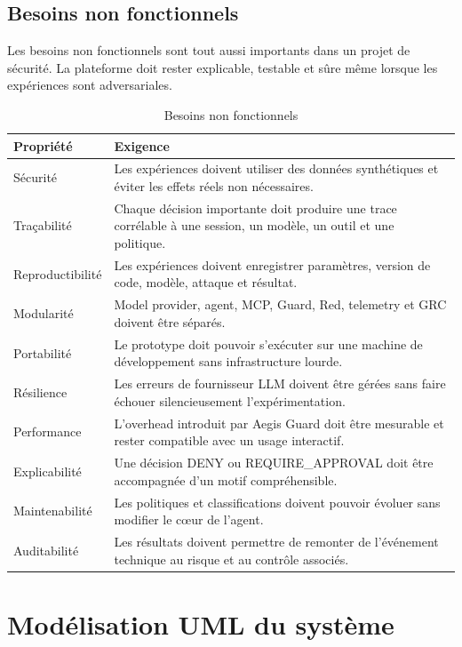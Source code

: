 \subsection{Besoins non fonctionnels}

Les besoins non fonctionnels sont tout aussi importants dans un projet de sécurité. La plateforme doit rester explicable, testable et sûre même lorsque les expériences sont adversariales.

\begin{table}[H]
\centering
\caption{Besoins non fonctionnels}
\label{tab:besoins-non-fonctionnels}
\begin{tabularx}{\textwidth}{p{2.2cm} X}
\toprule
\textbf{Propriété} & \textbf{Exigence} \\
\midrule
Sécurité & Les expériences doivent utiliser des données synthétiques et éviter les effets réels non nécessaires. \\
Traçabilité & Chaque décision importante doit produire une trace corrélable à une session, un modèle, un outil et une politique. \\
Reproductibilité & Les expériences doivent enregistrer paramètres, version de code, modèle, attaque et résultat. \\
Modularité & Model provider, agent, MCP, Guard, Red, telemetry et GRC doivent être séparés. \\
Portabilité & Le prototype doit pouvoir s'exécuter sur une machine de développement sans infrastructure lourde. \\
Résilience & Les erreurs de fournisseur LLM doivent être gérées sans faire échouer silencieusement l'expérimentation. \\
Performance & L'overhead introduit par Aegis Guard doit être mesurable et rester compatible avec un usage interactif. \\
Explicabilité & Une décision DENY ou REQUIRE\_APPROVAL doit être accompagnée d'un motif compréhensible. \\
Maintenabilité & Les politiques et classifications doivent pouvoir évoluer sans modifier le cœur de l'agent. \\
Auditabilité & Les résultats doivent permettre de remonter de l'événement technique au risque et au contrôle associés. \\
\bottomrule
\end{tabularx}
\end{table}

\section{Modélisation UML du système}

